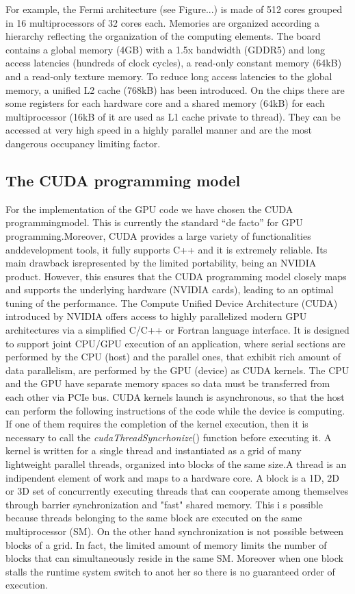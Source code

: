 \documentclass[11pt]{article}
\begin{document}
For example, the Fermi architecture (see Figure...) is made of 512 cores grouped in 16 multiprocessors of 32 cores each. Memories are organized according a hierarchy reflecting the organization of the computing elements. The board contains a global memory (4GB) with a 1.5x bandwidth (GDDR5) and long access latencies (hundreds of clock cycles), a read-only constant memory (64kB) and a read-only texture memory. To reduce long access latencies to the global memory, a unified L2 cache (768kB) has been introduced. On the chips there are some registers for each hardware core and a shared memory (64kB) for each multiprocessor (16kB of it are used as L1 cache private to thread). They can be accessed at very high speed in a highly parallel manner and are the most dangerous occupancy limiting factor.
 
\subsection{The CUDA programming model} 

For the implementation of the GPU code we have chosen the CUDA programmingmodel. This is currently the standard ``de facto'' for GPU programming.Moreover, CUDA provides a large variety of functionalities anddevelopment tools, it fully supports C++ and it is extremely reliable. Its main drawback isrepresented by the limited portability, being an NVIDIA product. However,
this ensures that the CUDA programming model closely maps and supports the underlying
hardware (NVIDIA cards), leading to an optimal tuning of the performance.
The Compute Unified Device Architecture (CUDA) introduced by NVIDIA offers access to highly parallelized modern GPU architectures via a simplified C/C++ or Fortran language interface. It is designed to support joint CPU/GPU execution of an application, where serial sections are performed by the CPU (host) and the parallel ones, that exhibit rich amount of data parallelism, are performed by the GPU (device) as CUDA kernels. The CPU and the GPU have separate memory spaces so data must be transferred from each other via PCIe bus. CUDA kernels launch is asynchronous, so that the host can
 perform the following instructions of the code while the device is computing. If one of them requires the completion 
of the kernel execution, then it is necessary to call the \textit{cudaThreadSyncrhonize}() function before executing it.
A kernel is written for a single thread and instantiated as a grid of many lightweight parallel threads, organized into blocks of the same size.A thread is an indipendent element of work and maps to a hardware core. A block is a 1D, 2D or 3D set of concurrently executing threads that can cooperate among themselves through barrier synchronization and "fast" shared memory. This i
s possible because threads belonging to the same block are executed on the same multiprocessor (SM). On the other hand
 synchronization is not possible between blocks of a grid. In fact, the limited amount of memory limits the number of 
blocks that can simultaneously reside in the same SM. Moreover when one block stalls the runtime system switch to anot
her so there is no guaranteed order of execution.
\end{document}
